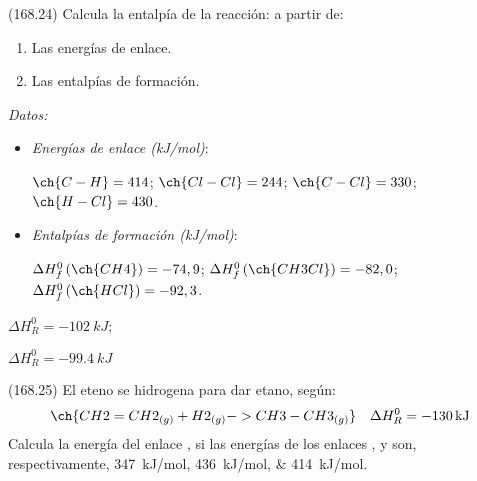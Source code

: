 \documentclass[10pt,a5paper,twoside]{article}
\newenvironment{gexdatos}{
      \vspace{4pt}
      \noindent\small\textit{Datos:}
    }{\vspace{5pt}}
\begin{document}
  \begin{exercise}[
      tags    = {},
      topics  = {química, termodinámica, termoquímica},
      source  = {FQ 1B MGH 2016, p168, e24},
    ]
    (168.24) Calcula la entalpía de la reacción:
     a partir de:
    \begin{enumerate}
      \item Las energías de enlace.
      \item Las entalpías de formación.
    \end{enumerate}

    \begin{gexdatos}
      \begin{itemize}
        \item \textit{Energías de enlace (\si{kJ/mol})}:

        \( \ch{C-H} = 414 \); \( \ch{Cl-Cl} = 244 \); \( \ch{C-Cl} = 330 \); \( \ch{H-Cl} = 430 \).

        \item \textit{Entalpías de formación (\si{kJ/mol})}:

        \( \Delta H^0_f\,(\ch{CH4}) = -74,9 \); \( \Delta H^0_f\,(\ch{CH3Cl}) = -82,0 \); \( \Delta H^0_f\,(\ch{HCl}) = -92,3 \).
      \end{itemize}
    \end{gexdatos}

  \end{exercise}

  \begin{solution}
    \begin{enumerate*}
      \item \( \Delta H^0_R = \SI{-102}{kJ} \); \item \( \Delta H^0_R = \SI{-99.4}{kJ} \)
    \end{enumerate*}
  \end{solution}




  \begin{exercise}[
      tags    = {},
      topics  = {química, termodinámica, termoquímica},
      source  = {FQ 1B MGH 2016, p168, e25},
    ]
    (168.25) El eteno se hidrogena para dar etano, según:
    \[ \ch{CH2=CH2_{(g)} + H2_{(g)} -> CH3-CH3_{(g)}} \quad \Delta H^0_R = \SI{-130}{kJ} \]
    Calcula la energía del enlace , si las energías de los
    enlaces ,  y  son, respectivamente, \SIlist{347;436;414}{kJ/mol}.
  \end{exercise}
\end{document}
